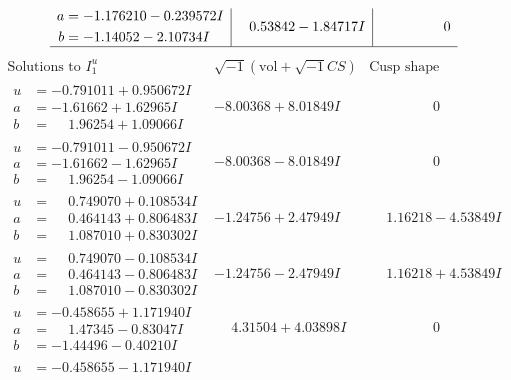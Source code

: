 \documentclass[1p]{elsarticle_modified}
\theoremstyle{definition}
\newcommand{\I}{\sqrt{-1}}
\begin{document}
$$\begin{array}{c|c|c}
\begin{aligned}
a &= -1.176210 - 0.239572 I \\
b &= -1.14052 - 2.10734 I\end{aligned}
 & \phantom{-}0.53842 - 1.84717 I & \phantom{-0.000000 } 0\\
 \hline 
 \end{array}$$\newpage$$\begin{array}{c|c|c}  
\text{Solutions to }I^u_{1}& \I (\text{vol} + \sqrt{-1}CS) & \text{Cusp shape}\\
 \hline 
\begin{aligned}
u &= -0.791011 + 0.950672 I \\
a &= -1.61662 + 1.62965 I \\
b &= \phantom{-}1.96254 + 1.09066 I\end{aligned}
 & -8.00368 + 8.01849 I & \phantom{-0.000000 } 0 \\ \hline\begin{aligned}
u &= -0.791011 - 0.950672 I \\
a &= -1.61662 - 1.62965 I \\
b &= \phantom{-}1.96254 - 1.09066 I\end{aligned}
 & -8.00368 - 8.01849 I & \phantom{-0.000000 } 0 \\ \hline\begin{aligned}
u &= \phantom{-}0.749070 + 0.108534 I \\
a &= \phantom{-}0.464143 + 0.806483 I \\
b &= \phantom{-}1.087010 + 0.830302 I\end{aligned}
 & -1.24756 + 2.47949 I & \phantom{-}1.16218 - 4.53849 I \\ \hline\begin{aligned}
u &= \phantom{-}0.749070 - 0.108534 I \\
a &= \phantom{-}0.464143 - 0.806483 I \\
b &= \phantom{-}1.087010 - 0.830302 I\end{aligned}
 & -1.24756 - 2.47949 I & \phantom{-}1.16218 + 4.53849 I \\ \hline\begin{aligned}
u &= -0.458655 + 1.171940 I \\
a &= \phantom{-}1.47345 - 0.83047 I \\
b &= -1.44496 - 0.40210 I\end{aligned}
 & \phantom{-}4.31504 + 4.03898 I & \phantom{-0.000000 } 0 \\ \hline\begin{aligned}
u &= -0.458655 - 1.171940 I \\

\end{aligned}
\end{array}$$
\end{document}
